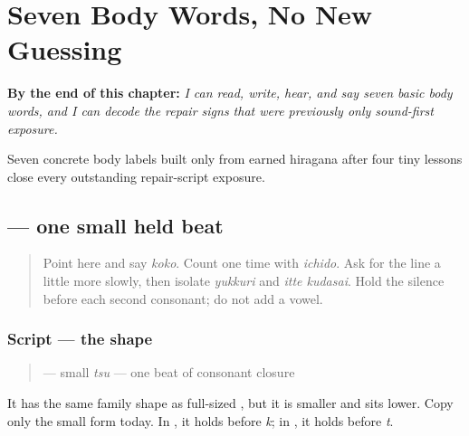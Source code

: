 
\chapter{Seven Body Words, No New Guessing}
\label{ch:ja-body-seven}

\begin{chapteropening}
\textbf{By the end of this chapter:} \emph{I can read, write, hear, and say seven basic body words, and I can decode the repair signs that were previously only sound-first exposure.}

Seven concrete body labels built only from earned hiragana after four tiny lessons close every outstanding repair-script exposure.
\end{chapteropening}

\section[\texorpdfstring{\ja{っ} (small tsu)}{っ (small tsu)}]{ — one small held beat}

\label{lesson:JA-W11-small-tsu}



\begin{quote}
Point here and say \emph{koko}. Count one time with \emph{ichido}. Ask for the line a little more slowly, then isolate \emph{yukkuri} and \emph{itte kudasai}. Hold the silence before each second consonant; do not add a vowel.
\end{quote}

\subsection*{Script — the shape}

\begin{quote}
\textbf{} — small \emph{tsu} — one beat of consonant closure
\end{quote}

It has the same family shape as full-sized \textbf{}, but it is smaller and sits lower. Copy only the small form today. In \textbf{}, it holds before \emph{k}; in \textbf{}, it holds before \emph{t}.

